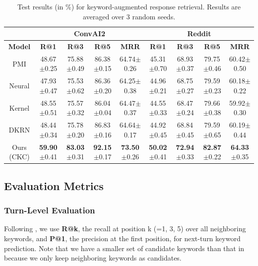 \documentclass[letterpaper]{article} %
\begin{document}
\begin{table}[!t]
\small
\centering
\begin{tabular}{c|cccc|cccc}
\hline
&\multicolumn{4}{c|}{\textbf{ConvAI2}}&\multicolumn{4}{c}{\textbf{Reddit}}\\
\hline
\textbf{Model} & \textbf{R@1} & \textbf{R@3} & \textbf{R@5} & \textbf{MRR} & \textbf{R@1} & \textbf{R@3} & \textbf{R@5} & \textbf{MRR}\\
\hline
PMI & 48.67$\pm$0.25 & 75.88$\pm$0.49 & 86.38$\pm$0.15 & 64.74$\pm$0.26 & 45.31$\pm$0.70 & 68.93$\pm$0.37 & 79.75$\pm$0.46 & 60.42$\pm$0.50\\

Neural & 47.93$\pm$0.47 & 75.53$\pm$0.62 & 86.36$\pm$0.20 & 64.25$\pm$0.38 & 44.96$\pm$0.21 & 68.75$\pm$0.27 & 79.59$\pm$0.23 & 60.18$\pm$0.22\\

Kernel & 48.55$\pm$0.51 & 75.57$\pm$0.32 & 86.04$\pm$0.04 & 64.47$\pm$0.37 & 44.55$\pm$0.33 & 68.47$\pm$0.24 & 79.66$\pm$0.38 & 59.92$\pm$0.30\\

DKRN & 48.44$\pm$0.34 & 75.78$\pm$0.20 & 86.83$\pm$0.16 & 64.64$\pm$0.17 & 44.92$\pm$0.45 & 68.84$\pm$0.45 & 79.59$\pm$0.65 & 60.19$\pm$0.44\\
\hline

Ours (CKC) & \textbf{59.90}$\pm$0.41 & \textbf{83.03}$\pm$0.31 & \textbf{92.15}$\pm$0.17 & \textbf{73.50}$\pm$0.26 & \textbf{50.02}$\pm$0.41 & \textbf{72.94}$\pm$0.33 & \textbf{82.87}$\pm$0.22 & \textbf{64.33}$\pm$0.35\\
\hline
\end{tabular}
\caption{Test results (in \%) for keyword-augmented response retrieval. Results are averaged over 3 random seeds.}
\label{table: keyword-augmented response retrieval}
\end{table}
\subsection{Evaluation Metrics}
\label{sec: evaluation metrics}
\subsubsection{Turn-Level Evaluation}
Following \cite{tang2019target, qin2020dynamic}, we use \textbf{R@k}, the recall at position k (=1, 3, 5) over all neighboring keywords, and \textbf{P@1}, the precision at the first position, for next-turn keyword prediction. Note that we have a smaller set of candidate keywords than that in \cite{tang2019target} because we only keep neighboring keywords as candidates.
\end{document}
